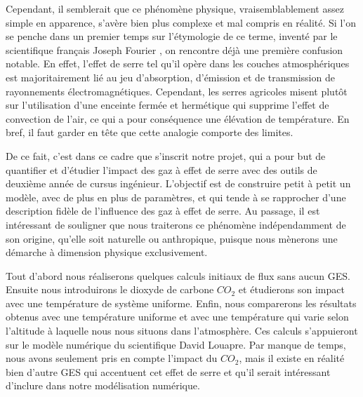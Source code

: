 \documentclass[a4paper, 12pt]{report} %
\begin{document}
\indent Cependant, il semblerait que ce phénomène physique, vraisemblablement assez simple 
en apparence, s'avère bien plus complexe et mal compris en réalité. Si l'on se penche dans un premier temps sur 
l'étymologie de ce terme, inventé par le scientifique français Joseph Fourier
,
on rencontre déjà une première confusion notable. En effet, l'effet de serre 
tel qu'il opère dans les couches atmosphériques est majoritairement lié au jeu d'absorption, d'émission 
et de transmission de rayonnements électromagnétiques. Cependant, les serres agricoles misent plutôt sur l'utilisation d'une enceinte 
fermée et hermétique qui supprime l'effet de convection de l'air, ce qui a pour conséquence une élévation 
de température. En bref, il faut garder en tête que cette analogie comporte des limites. \vspace{\baselineskip}

\indent De ce fait, c'est dans ce cadre que s'inscrit notre projet, qui a pour but de quantifier et d'étudier
l'impact des gaz à effet de serre avec des outils de deuxième année de cursus ingénieur. L'objectif est 
de construire petit à petit un modèle, avec de plus en plus de paramètres, et qui tende à se rapprocher
d'une description fidèle de l'influence des gaz à effet de serre. Au passage, il est intéressant de souligner
que nous traiterons ce phénomène indépendamment de son origine, qu'elle soit naturelle ou anthropique,
puisque nous mènerons une démarche à dimension physique exclusivement. \vspace{\baselineskip}

\indent Tout d'abord nous réaliserons quelques calculs initiaux de flux sans aucun GES. Ensuite nous introduirons le dioxyde de carbone $CO_2$ et étudierons son impact avec une température de
système uniforme. Enfin, nous comparerons les résultats obtenus avec une température uniforme et avec une température qui varie selon l'altitude à laquelle nous nous situons dans l'atmosphère.
Ces calculs s'appuieront sur le modèle numérique du scientifique David Louapre. Par manque de temps, nous avons seulement
pris en compte l’impact du $CO_2$, mais il existe en réalité bien d’autre GES qui accentuent cet effet de serre et qu'il serait intéressant d'inclure dans notre modélisation numérique. \vspace{\baselineskip}
\end{document}
